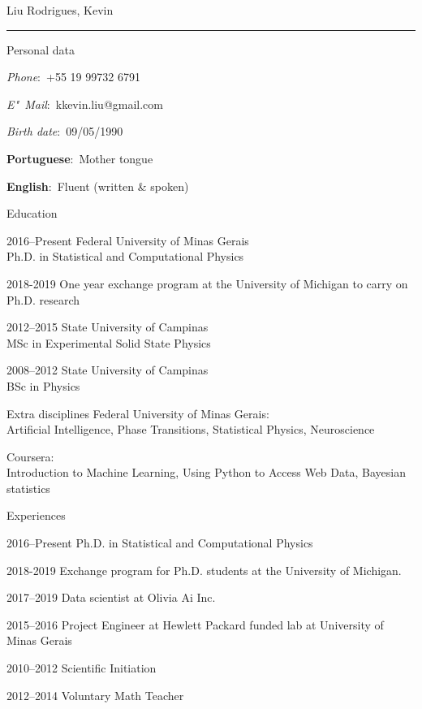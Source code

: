 \documentclass[12pt,a4paper]{article}
\begin{document}
\begin{cv}{Liu Rodrigues, Kevin}
\noindent\rule{\linewidth}{0.4pt}
    \begin{cvlist}{Personal data}
        \item \textit{Phone}:~+55 19 99732 6791
        \item \textit{E"~Mail}:~kkevin.liu@gmail.com
        \item \textit{Birth date}:~09/05/1990
  
        \item \textbf{Portuguese}:~Mother tongue
        \item \textbf{English}:~Fluent (written \& spoken)
    \end{cvlist}
  
  \begin{cvlist}{Education}
    \item[2016--Present] Federal University of Minas Gerais\\
                        Ph.D. in Statistical and Computational Physics
    \item[2018-2019] One year exchange program at the University of Michigan to carry on Ph.D. research
    \item[2012--2015] State University of Campinas\\
                        MSc in Experimental Solid State Physics
    \item[2008--2012] State University of Campinas\\
                        BSc in Physics
    \item[Extra disciplines] Federal University of Minas Gerais:\\
        Artificial Intelligence, Phase Transitions, Statistical Physics, Neuroscience
    \item[] Coursera:\\
        Introduction to Machine Learning, Using Python to Access Web Data, Bayesian statistics
  \end{cvlist}

  \begin{cvlist}{Experiences}
  \item[2016--Present] Ph.D. in Statistical and Computational Physics
  \item[2018-2019] Exchange program for Ph.D. students at the University of Michigan.
  \item[2017--2019] Data scientist at Olivia Ai Inc.
  \item[2015--2016] Project Engineer at Hewlett Packard funded lab at University of Minas Gerais
  \item[2010--2012] Scientific Initiation
  \item[2012--2014] Voluntary Math Teacher
  \end{cvlist}


\end{cv}
\end{document}
